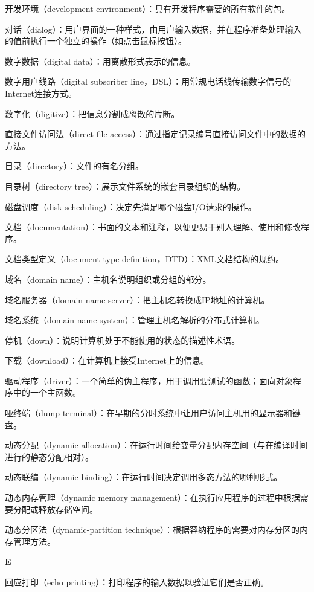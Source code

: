 开发环境（development environment）：具有开发程序需要的所有软件的包。

对话（dialog）：用户界面的一种样式，由用户输入数据，并在程序准备处理输入的值前执行一个独立的操作（如点击鼠标按钮）。

数字数据（digital data）：用离散形式表示的信息。

数字用户线路（digital subscriber line，DSL）：用常规电话线传输数字信号的Internet连接方式。

数字化（digitize）：把信息分割成离散的片断。

直接文件访问法（direct file access）：通过指定记录编号直接访问文件中的数据的方法。

目录（directory）：文件的有名分组。

目录树（directory tree）：展示文件系统的嵌套目录组织的结构。

磁盘调度（disk scheduling）：决定先满足哪个磁盘I/O请求的操作。

文档（documentation）：书面的文本和注释，以便更易于别人理解、使用和修改程序。

文档类型定义（document type definition，DTD）：XML文档结构的规约。

域名（domain name）：主机名说明组织或分组的部分。

域名服务器（domain name server）：把主机名转换成IP地址的计算机。

域名系统（domain name system）：管理主机名解析的分布式计算机。

停机（down）：说明计算机处于不能使用的状态的描述性术语。

下载（download）：在计算机上接受Internet上的信息。

驱动程序（driver）：一个简单的伪主程序，用于调用要测试的函数；面向对象程序中的一个主函数。

哑终端（dump terminal）：在早期的分时系统中让用户访问主机用的显示器和键盘。

动态分配（dynamic allocation）：在运行时间给变量分配内存空间（与在编译时间进行的静态分配相对）。

动态联编（dynamic binding）：在运行时间决定调用多态方法的哪种形式。

动态内存管理（dynamic memory management）：在执行应用程序的过程中根据需要分配或释放存储空间。

动态分区法（dynamic-partition technique）：根据容纳程序的需要对内存分区的内存管理方法。

\textbf{E}

回应打印（echo printing）：打印程序的输入数据以验证它们是否正确。

